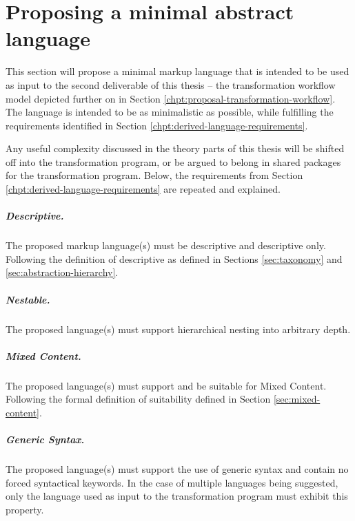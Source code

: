 \documentclass{scrreprt}
\begin{document}
%
%
%
%
%
%


\chapter{Proposing a minimal abstract language}
\label{chpt:proposal-language}
This section will propose a minimal markup language that is intended to be used as input to the second deliverable of this thesis -- the transformation workflow model depicted further on in Section \ref{chpt:proposal-transformation-workflow}. The language is intended to be as minimalistic as possible, while fulfilling the requirements identified in Section \ref{chpt:derived-language-requirements}.

Any useful complexity discussed in the theory parts of this thesis will be shifted off into the transformation program, or be argued to belong in shared packages for the transformation program. Below, the requirements from Section \ref{chpt:derived-language-requirements} are repeated and explained.


\paragraph{Descriptive.} The proposed markup language(s) must be descriptive and descriptive only. Following the definition of descriptive as defined in Sections \ref{sec:taxonomy} and \ref{sec:abstraction-hierarchy}.


\paragraph{Nestable.} The proposed language(s) must support hierarchical nesting into arbitrary depth.


\paragraph{Mixed Content.} The proposed language(s) must support and be suitable for Mixed Content. Following the formal definition of suitability defined in Section \ref{sec:mixed-content}.


\paragraph{Generic Syntax.} The proposed language(s) must support the use of generic syntax and contain no forced syntactical keywords. In the case of multiple languages being suggested, only the language used as input to the transformation program must exhibit this property.
\end{document}
